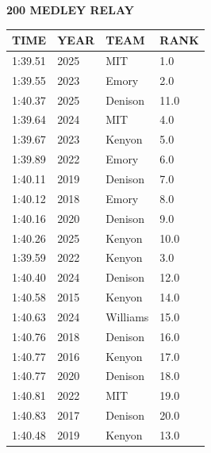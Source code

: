 \begin{table}[H]
\centering
\begin{minipage}[t]{0.6\textwidth}
\centering
\textbf{200 MEDLEY RELAY}\\[0.1cm]
\begin{tabular}{@{}p{1.8cm}p{1.2cm}p{1.4cm}p{0.8cm}@{}}
\hline
    \textbf{TIME} & \textbf{YEAR} & \textbf{TEAM} & \textbf{RANK} \\
\hline
    1:39.51 & 2025 & MIT & 1.0 \\
    1:39.55 & 2023 & Emory & 2.0 \\
    1:40.37 & 2025 & Denison & 11.0 \\
    1:39.64 & 2024 & MIT & 4.0 \\
    1:39.67 & 2023 & Kenyon & 5.0 \\
    1:39.89 & 2022 & Emory & 6.0 \\
    1:40.11 & 2019 & Denison & 7.0 \\
    1:40.12 & 2018 & Emory & 8.0 \\
    1:40.16 & 2020 & Denison & 9.0 \\
    1:40.26 & 2025 & Kenyon & 10.0 \\
    1:39.59 & 2022 & Kenyon & 3.0 \\
    1:40.40 & 2024 & Denison & 12.0 \\
    1:40.58 & 2015 & Kenyon & 14.0 \\
    1:40.63 & 2024 & Williams & 15.0 \\
    1:40.76 & 2018 & Denison & 16.0 \\
    1:40.77 & 2016 & Kenyon & 17.0 \\
    1:40.77 & 2020 & Denison & 18.0 \\
    1:40.81 & 2022 & MIT & 19.0 \\
    1:40.83 & 2017 & Denison & 20.0 \\
    1:40.48 & 2019 & Kenyon & 13.0 \\
\hline
\end{tabular}
\end{minipage}
\end{table}


